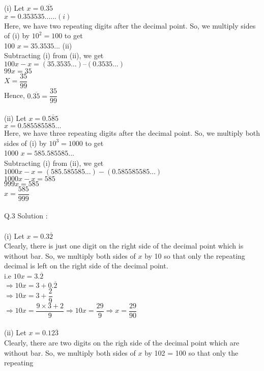 (i) Let $x = 0.\overline{35}$\\
$x = 0.353535......(i)$\\
Here, we have two repeating digits after the decimal point. So, we
multiply sides of (i) by $10^2 = 100$ to get\\
100 $x = 35.3535$... (ii)\\
Subtracting (i) from (ii), we get\\
$100x-x = (35.3535...) – (0.3535...)$\\
$99x = 35$\\
$X = \dfrac{35}{99}$\\
Hence, $0.\overline{35} = \dfrac{35}{99}$\\\\
(ii) Let $x = 0.\overline{585}$\\
$x = 0.585585585...$\\
Here, we have three repeating digits after the decimal point. So, we
multiply both sides of (i) by $10^3 =  1000$ to get\\
1000 $x = 585.585585...$\\
Subtracting (i) from (ii), we get\\
$1000 x-x = (585.585585...)- (0.585585585...)$\\
$1000 x-x = 585$\\
$999x = 585$\\
$ x = \dfrac{585}{999}$\\\\
Q.3 Solution :\\\\
(i) Let $x = 0.3\overline{2}$ \\
Clearly, there is just one digit on the right side of the decimal point
which is without bar. So,
we multiply both sides of $x$ by 10 so that only the repeating decimal is
left on the right side of
the decimal point.\\
 i.e $10 x = 3.\overline{2}$\\
$\Rightarrow 10x = 3+0.\overline{2}$\\
$\Rightarrow 10x = 3+\dfrac{2}{9}$\\
$\Rightarrow 10x = \dfrac{9\times3+2}{9} \Rightarrow 10x = \dfrac{29}{9}
\Rightarrow x = \dfrac{29}{90}$\\\\
(ii) Let $x = 0.12\overline{3}$\\
Clearly, there are two digits on the righ side of the decimal point
which are without bar. So,
we multiply both sides of $x$ by 102 = 100 so that only the repeating
